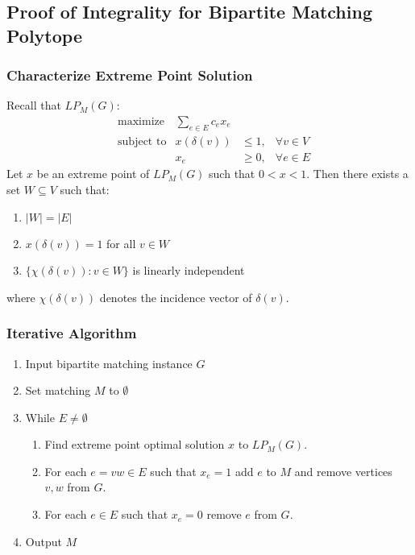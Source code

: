 \documentclass{beamer}
\begin{document}
\subsection{Proof of Integrality for Bipartite Matching Polytope}
\begin{frame}
\frametitle{Characterize Extreme Point Solution}
Recall that $LP_M(G):$
\begin{align*}
&\text{maximize} &\sum_{e \in E} c_e x_e \\
&\text{subject to} &x(\delta(v)) &\leq 1, &\forall v \in V\\
& &x_e &\geq 0, &\forall e \in E
\end{align*}
Let $x$ be an extreme point of $LP_M(G)$ such that $0<x<1$. Then there exists a set $W \subseteq V$ such that:
\begin{enumerate}
\item $|W| = |E|$
\item $x(\delta(v)) = 1$ for all $v \in W$
\item $\{\chi(\delta(v)) : v \in W \}$ is linearly independent
\end{enumerate}
where $\chi(\delta(v))$ denotes the incidence vector of $\delta(v)$.
\end{frame}

\begin{frame}
\frametitle{Iterative Algorithm}
\begin{enumerate}
\item Input bipartite matching instance $G$
\item Set matching $M$ to $\emptyset$
\item While $E \neq \emptyset$
\begin{enumerate}
\item Find extreme point optimal solution $x$ to $LP_M(G)$.
\item For each $e=vw \in E$ such that $x_e = 1$ add $e$ to $M$ and remove vertices $v,w$ from $G$.
\item For each $e \in E$ such that $x_e = 0$ remove $e$ from $G$.
\end{enumerate}
\item Output $M$
\end{enumerate}
\end{frame}
\end{document}
